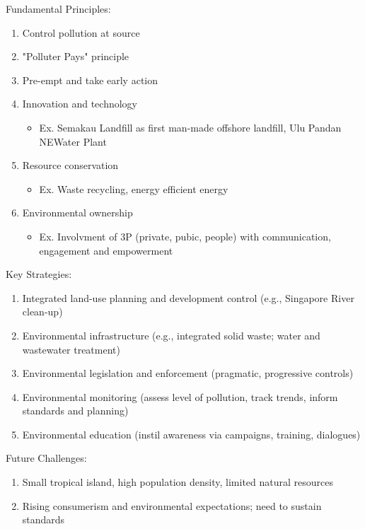 \documentclass[12pt, a4paper]{article}
\begin{document}
\begin{multicols*}{3}
Fundamental Principles:
\begin{enumerate}[\roman*.]
  \item Control pollution at source
  \item "Polluter Pays" principle
  \item Pre-empt and take early action
  \item Innovation and technology
    \begin{itemize}[leftmargin=*]\vspace{2pt}
      \item Ex. Semakau Landfill as first man-made offshore landfill, Ulu Pandan NEWater Plant
    \end{itemize}
  \item Resource conservation 
    \begin{itemize}[leftmargin=*]\vspace{2pt}
      \item Ex. Waste recycling, energy efficient energy 
    \end{itemize}
  \item Environmental ownership
    \begin{itemize}[leftmargin=*]\vspace{3pt}
      \item Ex. Involvment of 3P (private, pubic, people) with communication, engagement and empowerment
    \end{itemize}
\end{enumerate}

Key Strategies:
\begin{enumerate}[\roman*.]
  \item Integrated land-use planning and development control (e.g., Singapore River clean-up)
  \item Environmental infrastructure (e.g., integrated solid waste; water and wastewater treatment)
  \item Environmental legislation and enforcement (pragmatic, progressive controls)
  \item Environmental monitoring (assess level of pollution, track trends, inform standards and planning)
  \item Environmental education (instil awareness via campaigns, training, dialogues)
\end{enumerate}

Future Challenges:
\begin{enumerate}[\roman*.]
  \item Small tropical island, high population density, limited natural resources
  \item Rising consumerism and environmental expectations; need to sustain standards
\end{enumerate}
\colbreak

\end{multicols*}
\end{document}
